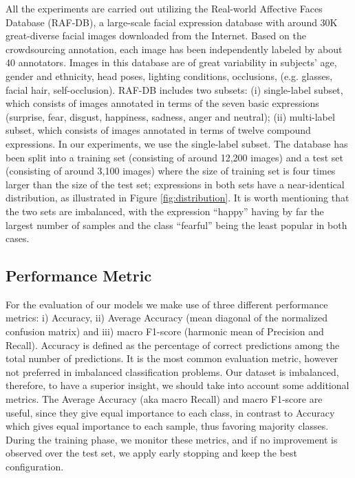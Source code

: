 \documentclass[10pt,twocolumn,letterpaper]{article}
\begin{document}
All the experiments are carried out utilizing the Real-world Affective Faces Database (RAF-DB), a large-scale facial expression database with around 30K great-diverse facial images downloaded from the Internet. Based on the crowdsourcing annotation, each image has been independently labeled by about 40 annotators. Images in this database are of great variability in subjects' age, gender and ethnicity, head poses, lighting conditions, occlusions, (e.g. glasses, facial hair, self-occlusion). RAF-DB includes two subsets: (i) single-label subset, which consists of images annotated in terms of the seven basic expressions (surprise, fear, disgust, happiness, sadness, anger and neutral); (ii) multi-label subset, which consists of images annotated in terms of twelve compound expressions. In our experiments, we use the single-label subset. 
The database has been split into a training set (consisting of around 12,200 images) and a test set (consisting of around 3,100 images) where the size of training set is four times larger than the size of the test set; expressions in both sets have a near-identical distribution, as illustrated in Figure \ref{fig:distribution}. It is worth mentioning that the two sets are imbalanced, with the expression \enquote{happy} having by far the largest number of samples and the class \enquote{fearful} being the least popular in both cases.

\begin{figure*}[t]
  \centering
{}
 \caption{Class distribution of the RAF-DB training and test sets}
 \label{fig:distribution}
\end{figure*}


\subsection{Performance Metric}
For the evaluation of our models we make use of three different performance metrics: i) Accuracy, ii) Average Accuracy (mean diagonal of the normalized confusion matrix) and iii) macro F1-score (harmonic mean of Precision and Recall). Accuracy is defined as the percentage of correct predictions among the total number of predictions. It is the most common evaluation metric, however not preferred in imbalanced classification problems. Our dataset is imbalanced, therefore, to have a superior insight, we should take into account some additional metrics. The Average Accuracy (aka macro Recall) and macro F1-score are useful, since they give equal importance to each class, in contrast to Accuracy which  gives equal importance to each sample, thus favoring majority classes. During the training phase, we monitor these metrics, and if no improvement is observed over the test set, we apply early stopping and keep the best configuration. 
\end{document}
